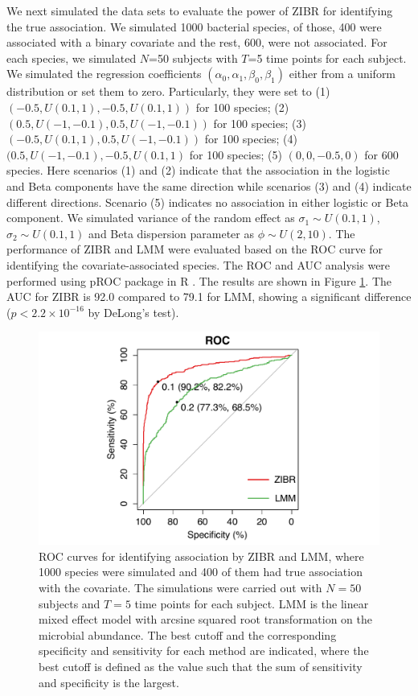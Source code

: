 We next simulated the data sets to evaluate the power of  ZIBR for identifying  the true association. We simulated 1000 bacterial species, of those, 400 were associated with a binary covariate and the rest, 600, were not associated.  For each species, we simulated $N$=50 subjects with $T$=5 time points for each subject. We simulated the regression coefficients $(\alpha_0,\alpha_1,\beta_0,\beta_1)$ either from a uniform distribution  or set them to zero. Particularly,  they were set to  (1)  $(-0.5, U(0.1,1), -0.5,  U(0.1,1))$ for 100 species; (2) $(0.5, U(-1,-0.1), 0.5,  U(-1,-0.1))$  for 100 species; (3)  $(-0.5, U(0.1,1), 0.5,  U(-1,-0.1))$ for 100 species; (4) 
$(0.5, U(-1,-0.1), -0.5,  U(0.1,1)$ for 100 species; (5) $(0, 0, -0.5, 0)$ for 600 species.  Here scenarios (1) and (2) indicate that the association in the logistic and Beta components have the same direction while scenarios (3) and (4) indicate different directions. Scenario (5) indicates no association  in either logistic or Beta component. We simulated variance of the random effect as $\sigma_1 \sim U(0.1, 1)$, $\sigma_2 \sim U(0.1, 1)$  and Beta dispersion parameter as $\phi \sim U(2,10)$. The performance of ZIBR and LMM were evaluated based on the ROC curve for identifying the covariate-associated species. The ROC and AUC analysis were performed using pROC package in R \citep{Robin:2011fc}. 
The results are shown in Figure \ref{Fig2}.
The AUC for ZIBR is 92.0 compared to 79.1 for LMM, showing a significant difference  ($p< 2.2 \times 10^{-16}$ by DeLong's test). 

\begin{figure}[!tpb]%
\centerline{\includegraphics[scale=0.8,trim=0 0 0 0,clip]{Figure/F42_ROC.pdf}}
\caption[ROC curves for identifying association by ZIBR and LMM]{ROC curves for identifying association by ZIBR and LMM, where 1000 species were  simulated and 400 of them had true association with the covariate. The simulations were carried out with $N=50$ subjects and $T=5$ time points for each subject. LMM is the linear mixed effect model with arcsine squared root transformation on the microbial abundance. The best cutoff and the corresponding specificity and sensitivity for each method are indicated, where the best cutoff is defined as the value such that the sum of sensitivity and specificity is the largest.}
\label{Fig2}
\end{figure}

